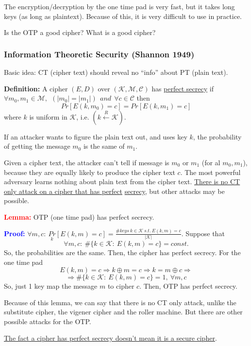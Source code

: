 \documentclass[12pt]{book}
\newcommand{\Def}{\textcolor{dkgreen}{\textbf{Definition:}} }
\newcommand{\Proof}{\textcolor{blue}{\textbf{Proof:}} }
\newcommand{\Lemma}{\textcolor{red}{\textbf{Lemma:}} }
\begin{document}
The encryption/decryption by the one time pad is very fast, but it takes long keys (as long as plaintext). Because of this, it is very difficult to use in practice.

Is the OTP a good cipher? What is a good cipher?

\subsubsection{Information Theoretic Security (Shannon 1949)}
Basic idea: CT (cipher text) should reveal no ``info'' about PT (plain text).

\Def A cipher $(E,D)$ over $\left(\mathcal{K},\mathcal{M},\mathcal{C}\right)$ has \underline{perfect secrecy} if $\forall m_{0}, m_{1} \in \mathcal{M},\ \ (|m_{0}|=|m_{1}|)\ \ and\ \ \forall c \in \mathcal{C}$ then $$Pr[E(k,m_{0})=c]=Pr[E(k,m_{1})=c]$$ where $k$ is uniform in $\mathcal{K}$, i.e. $\left(k\xleftarrow{R}\mathcal{K}\right)$.

If an attacker wants to figure the plain text out, and uses key $k$, the  probability of getting the message $m_{0}$ is the same of $m_{1}$.

Given a cipher text, the attacker can't tell if message is $m_{0}$ or $m_{1}$ (for al $m_{0},m_{1}$), because they are equally likely to produce the cipher text $c$. The most powerful adversary learns nothing about plain text from the cipher text. \underline{There is no CT only attack on a cipher that has perfect} \underline{secrecy}, but other attacks may be possible.

\Lemma OTP (one time pad) has perfect secrecy.

\Proof $\forall m,c:\ \underset{k}{Pr}\left[E(k,m)=c\right]=\frac{\#keys\ k\in \mathcal{K}\ s.t.\ E(k,m)=c}{\left|\mathcal{K}\right|}$. Suppose that $$\forall m,c:\ \#\{k\in\mathcal{K}:\ E(k,m)=c\}=const.$$ So, the probabilities are the same. Then, the cipher has perfect secrecy. For the one time pad $$E(k,m)=c\Rightarrow k\oplus m=c\Rightarrow k=m\oplus c\Rightarrow$$ $$\Rightarrow\#\{k\in\mathcal{K}:\ E(k,m)=c\}=1,\ \forall m,c$$ So, just 1 key map the message $m$ to cipher $c$. Then, OTP has perfect secrecy.

Because of this lemma, we can say that there is no CT only attack, unlike the substitute cipher, the vigener cipher and the roller machine. But there are other possible attacks for the OTP.

\underline{The fact a cipher has perfect secrecy doesn't mean it is a secure cipher}.
\end{document}
